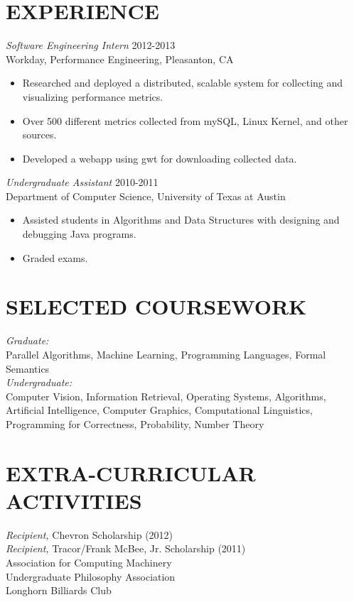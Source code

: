 \documentclass[line,margin]{res}
\begin{document}
\begin{resume}
\section{EXPERIENCE} {\sl Software Engineering Intern} \hfill 2012-2013 \\
                Workday, 
                Performance Engineering, Pleasanton, CA
                 \begin{itemize}  \itemsep -2pt %
                 \item Researched and deployed a distributed, scalable system for collecting and visualizing performance metrics.
								 \item Over 500 different metrics collected from mySQL, Linux Kernel, and other sources.
                 \item Developed a webapp using gwt for downloading collected data.
                \end{itemize}
 
                {\sl Undergraduate Assistant} \hfill        2010-2011 \\
                Department of Computer Science, University of Texas at Austin
                  \begin{itemize}
                   \item Assisted students in Algorithms and Data Structures with designing and debugging Java programs.
									 \item Graded exams.
                   \end{itemize} 
 
\section{SELECTED COURSEWORK} {\sl Graduate:} \\ Parallel Algorithms, Machine Learning, Programming Languages, Formal Semantics \\
															{\sl Undergraduate:} \\ Computer Vision, Information Retrieval, Operating Systems, Algorithms, 
															Artificial Intelligence, Computer Graphics, Computational Linguistics, Programming for Correctness, 
															Probability, Number Theory \\

\section{EXTRA-CURRICULAR \\ ACTIVITIES}            
								{\sl Recipient,} Chevron Scholarship (2012) \\
								{\sl Recipient,} Tracor/Frank McBee, Jr. Scholarship (2011) \\
                Association for Computing Machinery \\
								Undergraduate Philosophy Association \\
								Longhorn Billiards Club

\end{resume}
\end{document}
